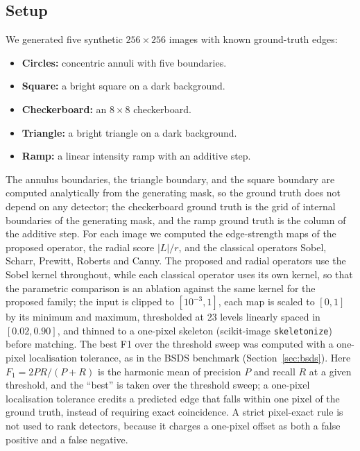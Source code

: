 \documentclass[conference]{IEEEtran}
\begin{document}
\subsection{Setup}
We generated five synthetic $256\times256$ images with known ground-truth
edges:
\begin{itemize}[leftmargin=1.4em]
  \item \textbf{Circles:} concentric annuli with five boundaries.
  \item \textbf{Square:} a bright square on a dark background.
  \item \textbf{Checkerboard:} an $8\times8$ checkerboard.
  \item \textbf{Triangle:} a bright triangle on a dark background.
  \item \textbf{Ramp:} a linear intensity ramp with an additive step.
\end{itemize}
The annulus boundaries, the triangle boundary, and the square boundary are
computed analytically from the generating mask, so the ground truth does not depend
on any detector; the checkerboard ground truth is the grid of internal boundaries of
the generating mask, and the ramp ground truth is the column of the additive step.
For each image we computed the edge-strength maps of the proposed operator,
the radial score $|L|/r$, and the classical operators Sobel, Scharr, Prewitt,
Roberts and Canny.  The proposed and radial operators use the Sobel kernel
throughout, while each classical operator uses its own kernel, so that the parametric
comparison is an ablation against the same kernel for the proposed family; the input is
clipped to $[10^{-3},1]$, each map is scaled to $[0,1]$ by its minimum and
maximum, thresholded at 23 levels linearly spaced in $[0.02,0.90]$, and thinned to a
one-pixel skeleton (scikit-image \texttt{skeletonize}) before matching.  The best F1 over the threshold sweep was
computed with a one-pixel localisation tolerance, as in the
BSDS benchmark (Section~\ref{sec:bsds}).  Here $F_1=2PR/(P+R)$ is the harmonic
mean of precision $P$ and recall $R$ at a given threshold, and the ``best'' is
taken over the threshold sweep; a one-pixel localisation tolerance credits a
predicted edge that falls within one pixel of the ground truth, instead of
requiring exact coincidence.  A strict pixel-exact rule is not used
to rank detectors, because it charges a one-pixel offset as both a false positive
and a false negative.
\end{document}
